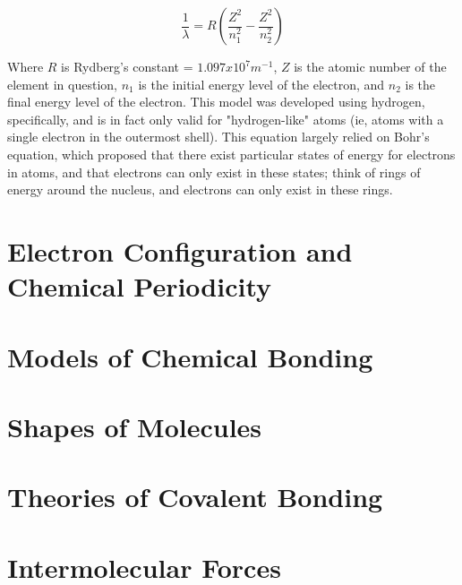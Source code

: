 \documentclass[12pt]{article}
\begin{document}
\begin{equation*}
    \frac{1}{\lambda} = R\left(\frac{Z^2}{n_1^2}-\frac{Z^2}{n_2^2}\right)
\end{equation*}

Where $R$ is Rydberg's constant = $1.097x10^{7} m^{-1}$, $Z$ is the atomic number of the element in question, $n_1$ is the initial energy level of the electron, and $n_2$ is the final energy level of the electron. This model was developed using hydrogen, specifically, and is in fact only valid for "hydrogen-like" atoms (ie, atoms with a single electron in the outermost shell). This equation largely relied on Bohr's equation, which proposed that there exist particular states of energy for electrons in atoms, and that electrons can only exist in these states; think of rings of energy around the nucleus, and electrons can only exist in these rings.
\section{Electron Configuration and Chemical Periodicity}

\section{Models of Chemical Bonding}

\section{Shapes of Molecules}

\section{Theories of Covalent Bonding}

\section{Intermolecular Forces}
\end{document}
